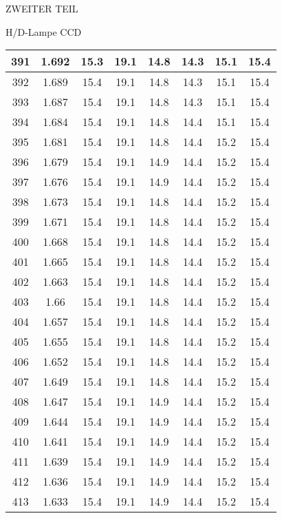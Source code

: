 \begin{appendix}
\begin{chapter}{ZWEITER TEIL}
\begin{section}{H/D-Lampe CCD}
\begin{scriptsize}
\begin{longtable}[htbp]{|c|c|c|c|c|c|c|c|}
            391 & 1.692 & 15.3 & 19.1 & 14.8 & 14.3 & 15.1 & 15.4 \\ \hline
            392 & 1.689 & 15.4 & 19.1 & 14.8 & 14.3 & 15.1 & 15.4 \\ \hline
            393 & 1.687 & 15.4 & 19.1 & 14.8 & 14.3 & 15.1 & 15.4 \\ \hline
            394 & 1.684 & 15.4 & 19.1 & 14.8 & 14.4 & 15.1 & 15.4 \\ \hline
            395 & 1.681 & 15.4 & 19.1 & 14.8 & 14.4 & 15.2 & 15.4 \\ \hline
            396 & 1.679 & 15.4 & 19.1 & 14.9 & 14.4 & 15.2 & 15.4 \\ \hline
            397 & 1.676 & 15.4 & 19.1 & 14.9 & 14.4 & 15.2 & 15.4 \\ \hline
            398 & 1.673 & 15.4 & 19.1 & 14.8 & 14.4 & 15.2 & 15.4 \\ \hline
            399 & 1.671 & 15.4 & 19.1 & 14.8 & 14.4 & 15.2 & 15.4 \\ \hline
            400 & 1.668 & 15.4 & 19.1 & 14.8 & 14.4 & 15.2 & 15.4 \\ \hline
            401 & 1.665 & 15.4 & 19.1 & 14.8 & 14.4 & 15.2 & 15.4 \\ \hline
            402 & 1.663 & 15.4 & 19.1 & 14.8 & 14.4 & 15.2 & 15.4 \\ \hline
            403 & 1.66 & 15.4 & 19.1 & 14.8 & 14.4 & 15.2 & 15.4 \\ \hline
            404 & 1.657 & 15.4 & 19.1 & 14.8 & 14.4 & 15.2 & 15.4 \\ \hline
            405 & 1.655 & 15.4 & 19.1 & 14.8 & 14.4 & 15.2 & 15.4 \\ \hline
            406 & 1.652 & 15.4 & 19.1 & 14.8 & 14.4 & 15.2 & 15.4 \\ \hline
            407 & 1.649 & 15.4 & 19.1 & 14.8 & 14.4 & 15.2 & 15.4 \\ \hline
            408 & 1.647 & 15.4 & 19.1 & 14.9 & 14.4 & 15.2 & 15.4 \\ \hline
            409 & 1.644 & 15.4 & 19.1 & 14.9 & 14.4 & 15.2 & 15.4 \\ \hline
            410 & 1.641 & 15.4 & 19.1 & 14.9 & 14.4 & 15.2 & 15.4 \\ \hline
            411 & 1.639 & 15.4 & 19.1 & 14.9 & 14.4 & 15.2 & 15.4 \\ \hline
            412 & 1.636 & 15.4 & 19.1 & 14.9 & 14.4 & 15.2 & 15.4 \\ \hline
            413 & 1.633 & 15.4 & 19.1 & 14.9 & 14.4 & 15.2 & 15.4 \\ \hline

\end{longtable}
\end{scriptsize}
\end{section}
\end{chapter}
\end{appendix}
